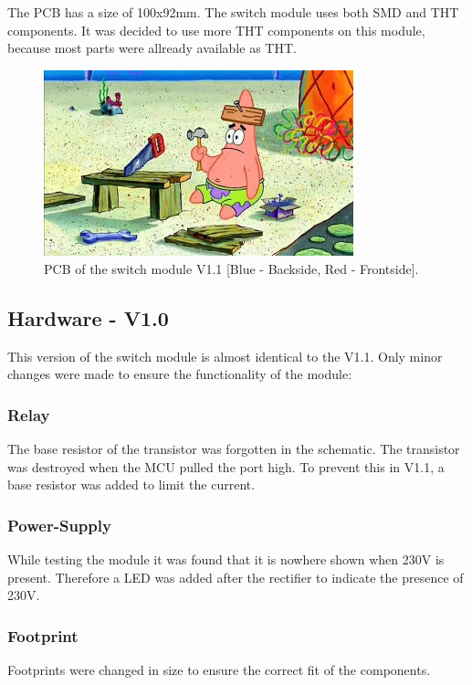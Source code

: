        The PCB has a size of 100x92mm. The switch module uses both SMD and THT components. It was decided to use more THT 
        components on this module, because most parts were allready available as THT.

        \begin{figure}[H]
            \centering
            \includegraphics[width=0.8\textwidth]{assets/HW/TBD.png}
            \caption{PCB of the switch module V1.1 [Blue - Backside, Red - Frontside].}
        \end{figure}


\subsection{Hardware - V1.0}

    This version of the switch module is almost identical to the V1.1. Only minor changes were made
    to ensure the functionality of the module:

    \subsubsection{Relay}
    The base resistor of the transistor was forgotten in the schematic. The transistor was destroyed
    when the MCU pulled the port high. To prevent this in V1.1, a base resistor was added to limit 
    the current.

    \subsubsection{Power-Supply}
    While testing the module it was found that it is nowhere shown when 230V is present. Therefore
    a LED was added after the rectifier to indicate the presence of 230V.

    \subsubsection{Footprint}
    Footprints were changed in size to ensure the correct fit of the components.

